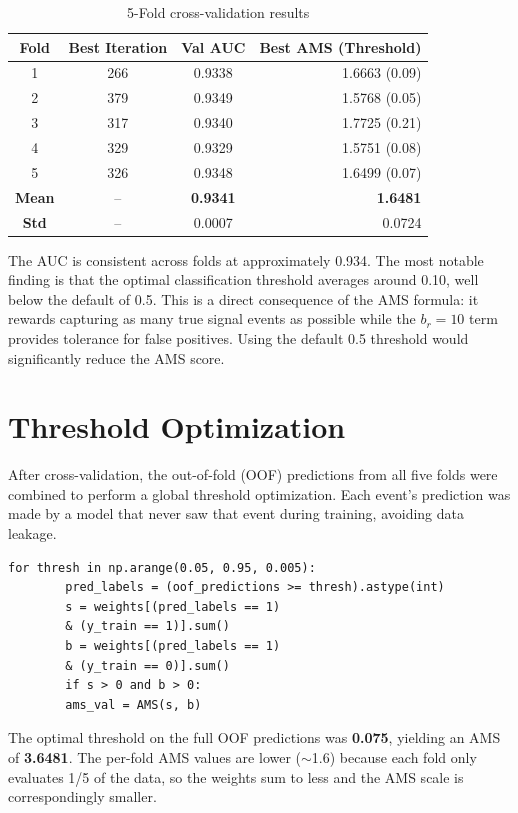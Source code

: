 \documentclass[12pt]{article}
\begin{document}
	\begin{table}[H]
		\centering
		\begin{tabular}{cccr}
			\toprule
			\textbf{Fold} & \textbf{Best Iteration} & \textbf{Val AUC} & \textbf{Best AMS (Threshold)} \\
			\midrule
			1 & 266 & 0.9338 & 1.6663 (0.09) \\
			2 & 379 & 0.9349 & 1.5768 (0.05) \\
			3 & 317 & 0.9340 & 1.7725 (0.21) \\
			4 & 329 & 0.9329 & 1.5751 (0.08) \\
			5 & 326 & 0.9348 & 1.6499 (0.07) \\
			\midrule
			\textbf{Mean} & -- & \textbf{0.9341} & \textbf{1.6481} \\
			\textbf{Std} & -- & 0.0007 & 0.0724 \\
			\bottomrule
		\end{tabular}
		\caption{5-Fold cross-validation results}
	\end{table}
	\newpage
	The AUC is consistent across folds at approximately 0.934. The most notable finding is that the optimal classification threshold averages around 0.10, well below the default of 0.5. This is a direct consequence of the AMS formula: it rewards capturing as many true signal events as possible while the $b_r = 10$ term provides tolerance for false positives. Using the default 0.5 threshold would significantly reduce the AMS score.
	
	\newpage
	\section*{Threshold Optimization}
	
	After cross-validation, the out-of-fold (OOF) predictions from all five folds were combined to perform a global threshold optimization. Each event's prediction was made by a model that never saw that event during training, avoiding data leakage.
	
	\begin{lstlisting}[caption={Global threshold optimization on OOF predictions}]
		for thresh in np.arange(0.05, 0.95, 0.005):
		pred_labels = (oof_predictions >= thresh).astype(int)
		s = weights[(pred_labels == 1) 
		& (y_train == 1)].sum()
		b = weights[(pred_labels == 1) 
		& (y_train == 0)].sum()
		if s > 0 and b > 0:
		ams_val = AMS(s, b)
	\end{lstlisting}
	
	The optimal threshold on the full OOF predictions was \textbf{0.075}, yielding an AMS of \textbf{3.6481}. The per-fold AMS values are lower ($\sim$1.6) because each fold only evaluates 1/5 of the data, so the weights sum to less and the AMS scale is correspondingly smaller.
	
\end{document}
